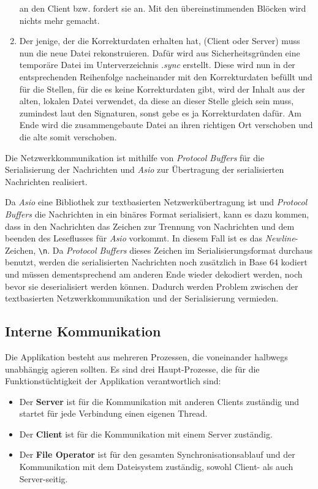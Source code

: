 \begin{enumerate}
      an den Client bzw. fordert sie an. Mit den übereinstimmenden Blöcken wird nichts mehr gemacht.
\item Der jenige, der die Korrekturdaten erhalten hat, (Client oder Server) muss nun die neue Datei rekonstruieren. Dafür wird aus Sicherheitsgründen eine temporäre Datei
      im Unterverzeichnis \textit{.sync} erstellt. Diese wird nun in der entsprechenden Reihenfolge nacheinander mit den Korrekturdaten befüllt und für die Stellen, für die
      es keine Korrekturdaten gibt, wird der Inhalt aus der alten, lokalen Datei verwendet, da diese an dieser Stelle gleich sein muss, zumindest laut den Signaturen, 
      sonst gebe es ja Korrekturdaten dafür. Am Ende wird die zusammengebaute Datei an ihren richtigen Ort verschoben und die alte somit verschoben.
\end{enumerate}

Die Netzwerkkommunikation ist mithilfe von \textit{Protocol Buffers}\cite{proto} für die Serialisierung der Nachrichten und \textit{Asio}\cite{asio} zur Übertragung 
der serialisierten Nachrichten realisiert.

Da \textit{Asio} eine Bibliothek zur textbasierten Netzwerkübertragung ist und \textit{Protocol Buffers} die Nachrichten in ein binäres Format serialisiert, kann es dazu kommen,
dass in den Nachrichten das Zeichen zur Trennung von Nachrichten und dem beenden des Leseflusses für \textit{Asio} vorkommt. In diesem Fall ist es das \textit{Newline}-Zeichen,
\verb|\n|. Da \textit{Protocol Buffers} dieses Zeichen im Serialisierungsformat durchaus benutzt, werden die serialisierten Nachrichten noch zusätzlich in Base 64 kodiert und
müssen dementsprechend am anderen Ende wieder dekodiert werden, noch bevor sie deserialisiert werden können. Dadurch werden Problem zwischen der textbasierten Netzwerkkommunikation
und der Serialisierung vermieden.

\subsection{Interne Kommunikation}

Die Applikation besteht aus mehreren Prozessen, die voneinander halbwegs unabhängig agieren sollten. Es sind drei Haupt-Prozesse, die für die Funktionstüchtigkeit der Applikation
verantwortlich sind:
\begin{itemize}
\item Der \textbf{Server} ist für die Kommunikation mit anderen Clients zuständig und startet für jede Verbindung einen eigenen Thread.

\item Der \textbf{Client} ist für die Kommunikation mit einem Server zuständig.

\item Der \textbf{File Operator} ist für den gesamten Synchronisationsablauf und der Kommunikation mit dem Dateisystem zuständig, sowohl Client- als auch Server-seitig. 
\end{itemize}


